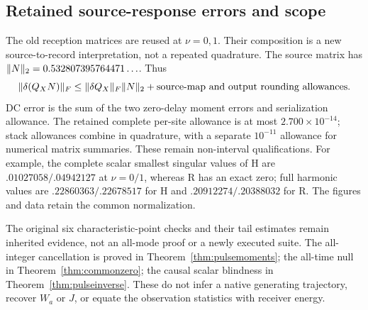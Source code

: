 \subsection{Retained source-response errors and scope}\label{sec:pulseerrors}
The old reception matrices are reused at $\nu=0,1$. Their composition is a new source-to-record interpretation, not a repeated quadrature. The source matrix has $\lVert N\rVert_2=0.532807395764471\ldots$. Thus
\begin{equation}\label{eq:compositionerror}
 \lVert\delta(Q_XN)\rVert_F\le\lVert\delta Q_X\rVert_F\lVert N\rVert_2
 +\text{source-map and output rounding allowances}.
\end{equation}
DC error is the sum of the two zero-delay moment errors and serialization allowance. The retained complete per-site allowance is at most $2.700\times10^{-14}$; stack allowances combine in quadrature, with a separate $10^{-11}$ allowance for numerical matrix summaries. These remain non-interval qualifications. For example, the complete scalar smallest singular values of H are $.01027058/.04942127$ at $\nu=0/1$, whereas R has an exact zero; full harmonic values are $.22860363/.22678517$ for H and $.20912274/.20388032$ for R. The figures and data retain the common normalization.

The original six characteristic-point checks and their tail estimates remain inherited evidence, not an all-mode proof or a newly executed suite. The all-integer cancellation is proved in Theorem~\ref{thm:pulsemoments}; the all-time null in Theorem~\ref{thm:commonzero}; the causal scalar blindness in Theorem~\ref{thm:pulseinverse}. These do not infer a native generating trajectory, recover $W_a$ or $J$, or equate the observation statistics with receiver energy.
